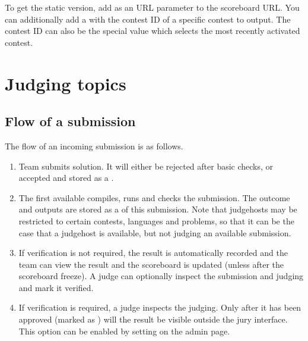 \documentclass[a4paper,10pt,english,openany]{sphinxmanual}
\begin{document}
\sphinxAtStartPar
To get the static version, add  as an URL parameter to
the  scoreboard URL. You can additionally add a
 with the contest ID of a specific contest to output.
The contest ID can also be the special value  which selects
the most recently activated contest.

\sphinxstepscope


\section{Judging topics}
\label{\detokenize{judging:judging-topics}}\label{\detokenize{judging::doc}}

\subsection{Flow of a submission}
\label{\detokenize{judging:flow-of-a-submission}}
\sphinxAtStartPar
The flow of an incoming submission is as follows.
\begin{enumerate}
%
\item {} 
\sphinxAtStartPar
Team submits solution. It will either be rejected after basic
checks, or accepted and stored as a .

\item {} 
\sphinxAtStartPar
The first available  compiles, runs and checks
the submission. The outcome and outputs are stored as a
 of this submission. Note that judgehosts may be
restricted to certain contests, languages and problems, so that it can be
the case that a judgehost is available, but not judging an available
submission.

\item {} 
\sphinxAtStartPar
If verification is not required, the result is automatically
recorded and the team can view the result and the scoreboard is
updated (unless after the scoreboard freeze). A judge can
optionally inspect the submission and judging and mark it
verified.

\item {} 
\sphinxAtStartPar
If verification is required, a judge inspects the judging. Only
after it has been approved (marked as ) will
the result be visible outside the jury interface. This option
can be enabled by setting  on
the  admin page.

\end{enumerate}
\end{document}
